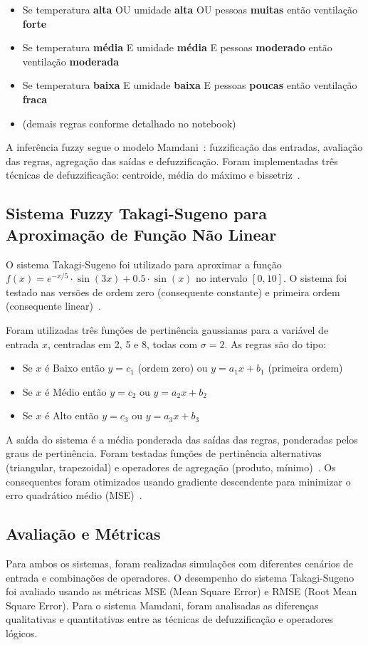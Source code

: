\begin{itemize}
    \item Se temperatura \textbf{alta} OU umidade \textbf{alta} OU pessoas \textbf{muitas} então ventilação \textbf{forte}
    \item Se temperatura \textbf{média} E umidade \textbf{média} E pessoas \textbf{moderado} então ventilação \textbf{moderada}
    \item Se temperatura \textbf{baixa} E umidade \textbf{baixa} E pessoas \textbf{poucas} então ventilação \textbf{fraca}
    \item (demais regras conforme detalhado no notebook)
\end{itemize}

A inferência fuzzy segue o modelo Mamdani~\cite{mamdani1975experiment}: fuzzificação das entradas, avaliação das regras, agregação das saídas e defuzzificação. Foram implementadas três técnicas de defuzzificação: centroide, média do máximo e bissetriz~\cite{ross2010fuzzy}.

\subsection{Sistema Fuzzy Takagi-Sugeno para Aproximação de Função Não Linear}

O sistema Takagi-Sugeno foi utilizado para aproximar a função $f(x) = e^{-x/5} \cdot \sin(3x) + 0.5 \cdot \sin(x)$ no intervalo $[0, 10]$. O sistema foi testado nas versões de ordem zero (consequente constante) e primeira ordem (consequente linear)~\cite{takagi1985fuzzy,sugeno1985industrial}.

Foram utilizadas três funções de pertinência gaussianas para a variável de entrada $x$, centradas em 2, 5 e 8, todas com $\sigma = 2$. As regras são do tipo:

\begin{itemize}
    \item Se $x$ é Baixo então $y = c_1$ (ordem zero) ou $y = a_1 x + b_1$ (primeira ordem)
    \item Se $x$ é Médio então $y = c_2$ ou $y = a_2 x + b_2$
    \item Se $x$ é Alto então $y = c_3$ ou $y = a_3 x + b_3$
\end{itemize}

A saída do sistema é a média ponderada das saídas das regras, ponderadas pelos graus de pertinência. Foram testadas funções de pertinência alternativas (triangular, trapezoidal) e operadores de agregação (produto, mínimo)~\cite{ross2010fuzzy}. Os consequentes foram otimizados usando gradiente descendente para minimizar o erro quadrático médio (MSE)~\cite{haykin2008neural}.

\subsection{Avaliação e Métricas}

Para ambos os sistemas, foram realizadas simulações com diferentes cenários de entrada e combinações de operadores. O desempenho do sistema Takagi-Sugeno foi avaliado usando as métricas MSE (Mean Square Error) e RMSE (Root Mean Square Error). Para o sistema Mamdani, foram analisadas as diferenças qualitativas e quantitativas entre as técnicas de defuzzificação e operadores lógicos.
